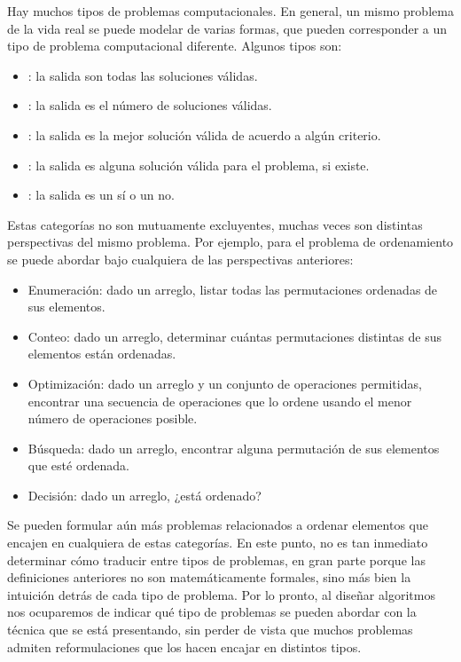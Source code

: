 Hay muchos tipos de problemas computacionales. En general, un mismo problema de la vida real se puede modelar de varias formas, que pueden corresponder a un tipo de problema computacional diferente. Algunos tipos son:
\begin{itemize}
  \item {}: la salida son todas las soluciones válidas.
  \item {}: la salida es el número de soluciones válidas.
  \item {}: la salida es la mejor solución válida de acuerdo a algún criterio.
  \item {}: la salida es alguna solución válida para el problema, si existe.
  \item {}\label{problema_decision}: la salida es un sí o un no.
\end{itemize}
Estas categorías no son mutuamente excluyentes, muchas veces son distintas perspectivas del mismo problema. Por ejemplo, para el problema de ordenamiento se puede abordar bajo cualquiera de las perspectivas anteriores:
\begin{itemize}
  \item Enumeración: dado un arreglo, listar todas las permutaciones ordenadas de sus elementos.
  \item Conteo: dado un arreglo, determinar cuántas permutaciones distintas de sus elementos están ordenadas.
  \item Optimización: dado un arreglo y un conjunto de operaciones permitidas, encontrar una secuencia de operaciones que lo ordene usando el menor número de operaciones posible.
  \item Búsqueda: dado un arreglo, encontrar alguna permutación de sus elementos que esté ordenada.
  \item Decisión: dado un arreglo, ¿está ordenado?
\end{itemize}
Se pueden formular aún más problemas relacionados a ordenar elementos que encajen en cualquiera de estas categorías. En este punto, no es tan inmediato determinar cómo traducir entre tipos de problemas, en gran parte porque las definiciones anteriores no son matemáticamente formales, sino más bien la intuición detrás de cada tipo de problema. Por lo pronto, al diseñar algoritmos nos ocuparemos de indicar qué tipo de problemas se pueden abordar con la técnica que se está presentando, sin perder de vista que muchos problemas admiten reformulaciones que los hacen encajar en distintos tipos.
